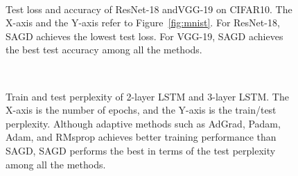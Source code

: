 \documentclass[11pt]{article}
\begin{document}
\begin{figure}[t!]
\mbox{
\hspace{-0.1in}
 }
 \caption[]{Test loss and accuracy of ResNet-18 andVGG-19 on CIFAR10. The X-axis and the
Y-axis refer to Figure~\ref{fig:mnist}. For ResNet-18, \textsc{SAGD} achieves the lowest test loss. For VGG-19, \textsc{SAGD} achieves the best test accuracy among all the methods. } 
 \label{fig:cifar10}
\end{figure}

\begin{figure}[t!]
\mbox{
\hspace{-0.1in}
}
\vspace{-0.1in}
 \caption[]{Train and test perplexity of 2-layer LSTM and 3-layer LSTM. The X-axis is the number of epochs, and the Y-axis is the train/test perplexity. Although adaptive methods such as AdGrad, Padam, Adam, and RMsprop achieves better training performance than \textsc{SAGD}, \textsc{SAGD} performs the best in terms of the test perplexity among all the methods.} 
 \label{fig:ptb}
\end{figure}
\end{document}
